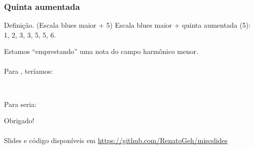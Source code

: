 \documentclass[usenames,dvipsnames]{beamer}
\newcommand\srbc[1]{{\footnotesize\rbc{#1}}}
\begin{document}
\begin{frame}[fragile]
  \frametitle{Quinta aumentada}

  \begin{block}{Definição. (Escala blues maior + 5\srbc{\s})}
    Escala blues maior + quinta aumentada (5\srbc{\s}): 1, 2, 3\srbc{\b}, 3, 5, 5\srbc{\s}, 6.
  \end{block}
  \pause

  Estamos ``emprestando'' uma nota do campo harmônico menor.\\~\\

  Para , teríamos:\\

  \begin{center}
  \end{center}~\\
  \pause

  Para  seria:\\

  \begin{center}
  \end{center}
\end{frame}

\begin{frame}
  \begin{center}
    \large Obrigado!\\~\\
    \normalsize Slides e código disponíveis em \url{https://github.com/RenatoGeh/miscslides}
  \end{center}
\end{frame}
\end{document}
